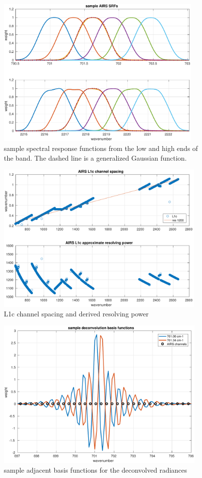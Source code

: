 \documentclass[11pt]{article}
\begin{document}
\begin{figure} %
  \centering
  \includegraphics[height=7.5cm]{figures/airs_sample_srfs.pdf}
  \caption{sample {\airs} spectral response functions from the low
    and high ends of the band.   The dashed line is a generalized
    Gaussian function.}
  \label{srfs1}
\end{figure}

\begin{figure} %
  \centering
  \includegraphics[height=7.5cm]{figures/airs_L1c_res.pdf}
  \caption{{\airs} L1c channel spacing and derived resolving
    power}
  \label{chan1}
\end{figure}

\begin{figure} %
  \centering
  \includegraphics[height=7.5cm]{figures/airs_decon_basis.pdf}
  \caption{sample adjacent basis functions for the deconvolved
    {\airs} radiances}
  \label{dbasis}
\end{figure}
\end{document}
